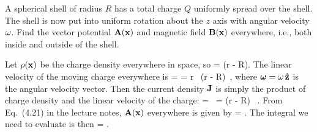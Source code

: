 \begin{statement}{}
	A spherical shell of radius $R$ has a total charge $Q$ uniformly spread over the shell.  The shell is now put into uniform rotation about the $z$ axis with angular velocity $\omega$.  Find the vector potential $\vb{A}(\vb{x})$ and magnetic field $\vb{B}(\vb{x})$ everywhere, i.e., both inside and outside of the shell.
\end{statement}

\begin{solution}
	Let $\rho(\vb{x})$ be the charge density everywhere in space, so
	\beq
		\rhox =   \delta(r - R).
	\eeq
	The linear velocity of the moving charge everywhere is
	\beq
		\vvx = \vomg \times \vx
		= \omg r \, \delta(r - R)\, \phh,
	\eeq
	where $\boldsymbol{\omega} = \omega \,\vb{\hat{z}}$ is the angular velocity vector.  Then the current density $\vb{J}$ is simply the product of charge density and the linear velocity of the charge:
	\beq
		\vJx = \rhox \, \vvx
		=   \delta(r - R) \, \phh.
	\eeq
	From Eq.~(4.21) in the lecture notes, $\vb{A}(\vb{x})$ everywhere is given by
	\beq
		\vAx =  \int {} \dcxp.
	\eeq
	The integral we need to evaluate is then
	\beqn \label{int1}
		\vAx =   \int {} \dcxp.
	\eeqn
	

\end{solution}
